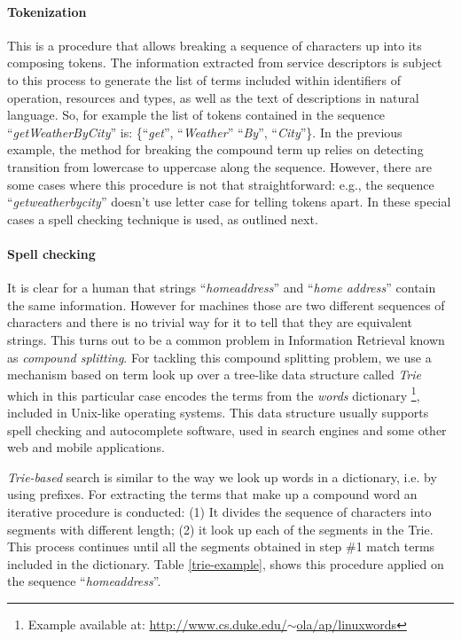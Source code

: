 \paragraph{Tokenization}
\label{parag:tokenization}
This is a procedure that allows breaking a sequence of characters up into its composing tokens. The information extracted from service descriptors is subject to this process to generate the list of terms included within identifiers of operation, resources and types, as well as the text of descriptions in natural language. So, for example the list of tokens contained in the sequence ``\emph{getWeatherByCity}'' is: \{\textquotedblleft{}\emph{get}\textquotedblright{}, \textquotedblleft{}\emph{Weather}\textquotedblright{} \textquotedblleft{}\emph{By}\textquotedblright{}, \textquotedblleft{}\emph{City}\textquotedblright{}\}. In the previous example, the method for breaking the compound term up relies on detecting transition from lowercase to uppercase along the sequence. However, there are some cases where this procedure is not that straightforward: e.g., the sequence ``\emph{getweatherbycity}'' doesn't use letter case for telling tokens apart. In these special cases a spell checking technique is used, as outlined next.


\paragraph{Spell checking}
\label{parag:spell-checking}
It is clear for a human that strings \textquotedblleft{}\emph{homeaddress}\textquotedblright{} and \textquotedblleft{}\emph{home address}\textquotedblright{} contain the same information. However for machines those are two different sequences of characters and there is no trivial way for it to tell that they are equivalent strings. This turns out to be a common problem in Information Retrieval \cite{Airio:2006} known as \emph{compound splitting}. For tackling this compound splitting problem, we use a mechanism based on term look up over a tree-like data structure called \emph{Trie} \cite{Fredkin:1960} which in this particular case encodes the terms from the \emph{words }dictionary \footnote{Example available at: \href{http://www.cs.duke.edu/~ola/ap/linuxwords}{http://www.cs.duke.edu/$\sim$ola/ap/linuxwords}}, included in Unix-like operating systems. This data structure usually supports spell checking and autocomplete software, used in search engines and some other web and mobile applications.

\emph{Trie-based }search is similar to the way we look up words in a dictionary, i.e. by using prefixes. For extracting the terms that make up a compound word an iterative procedure is conducted: (1) It divides the sequence of characters into segments with different length; (2) it look up each of the segments in the Trie. This process continues until all the segments obtained in step \#1 match terms included in the dictionary. Table \ref{trie-example}, shows this procedure applied on the sequence \textquotedblleft{}\emph{homeaddress}\textquotedblright{}.

